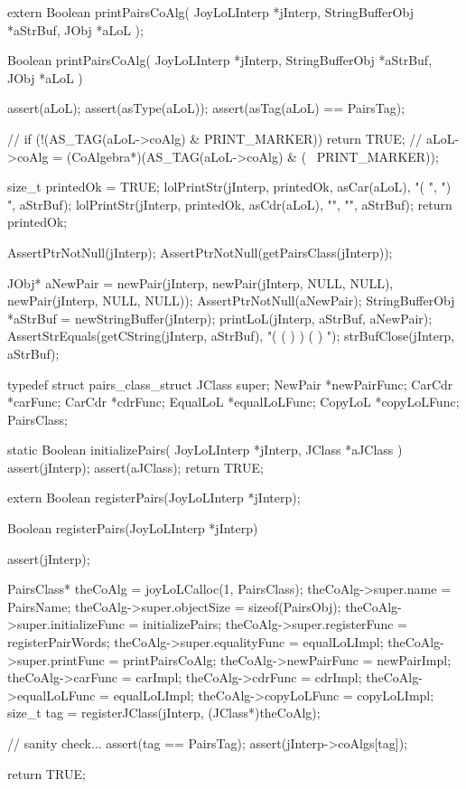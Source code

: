 \startCHeader
extern Boolean printPairsCoAlg(
  JoyLoLInterp    *jInterp,
  StringBufferObj *aStrBuf,
  JObj        *aLoL
);
\stopCHeader
{}

\startCCode
Boolean printPairsCoAlg(
  JoyLoLInterp    *jInterp,
  StringBufferObj *aStrBuf,
  JObj        *aLoL
) {
  assert(aLoL);
  assert(asType(aLoL));
  assert(asTag(aLoL) == PairsTag);

//  if (!(AS_TAG(aLoL->coAlg) & PRINT_MARKER)) return TRUE;
//  aLoL->coAlg = (CoAlgebra*)(AS_TAG(aLoL->coAlg) & (~ PRINT_MARKER));

  size_t printedOk = TRUE;
  lolPrintStr(jInterp, printedOk, asCar(aLoL), "( ", ") ", aStrBuf);
  lolPrintStr(jInterp, printedOk, asCdr(aLoL), "",   "",   aStrBuf);
  return printedOk;
}
\stopCCode


\startCTest
  AssertPtrNotNull(jInterp);
  AssertPtrNotNull(getPairsClass(jInterp));

  JObj* aNewPair = newPair(jInterp,
                               newPair(jInterp, NULL, NULL),
                               newPair(jInterp, NULL, NULL));
  AssertPtrNotNull(aNewPair);
  StringBufferObj *aStrBuf = newStringBuffer(jInterp);
  printLoL(jInterp, aStrBuf, aNewPair);
  AssertStrEquals(getCString(jInterp, aStrBuf), "( ( ) ) ( ) ");
  strBufClose(jInterp, aStrBuf);
\stopCTest
\stopTestCase
\stopTestSuite

\startTestSuite[registerPairs]

\startCHeader
typedef struct pairs_class_struct {
  JClass  super;
  NewPair    *newPairFunc;
  CarCdr     *carFunc;
  CarCdr     *cdrFunc;
  EqualLoL   *equalLoLFunc;
  CopyLoL    *copyLoLFunc;
} PairsClass;
\stopCHeader

\startCCode
static Boolean initializePairs(
  JoyLoLInterp *jInterp,
  JClass   *aJClass
) {
  assert(jInterp);
  assert(aJClass);
  return TRUE;
}
\stopCCode

\startCHeader
extern Boolean registerPairs(JoyLoLInterp *jInterp);
\stopCHeader
{}

\startCCode
Boolean registerPairs(JoyLoLInterp *jInterp) {
  assert(jInterp);
  
  PairsClass* theCoAlg           = joyLoLCalloc(1, PairsClass);
  theCoAlg->super.name           = PairsName;
  theCoAlg->super.objectSize     = sizeof(PairsObj);
  theCoAlg->super.initializeFunc = initializePairs;
  theCoAlg->super.registerFunc   = registerPairWords;
  theCoAlg->super.equalityFunc   = equalLoLImpl;
  theCoAlg->super.printFunc      = printPairsCoAlg;
  theCoAlg->newPairFunc          = newPairImpl;
  theCoAlg->carFunc              = carImpl;
  theCoAlg->cdrFunc              = cdrImpl;
  theCoAlg->equalLoLFunc         = equalLoLImpl;
  theCoAlg->copyLoLFunc          = copyLoLImpl;
  size_t tag =
    registerJClass(jInterp, (JClass*)theCoAlg);
  
  // sanity check...
  assert(tag == PairsTag);
  assert(jInterp->coAlgs[tag]);

  return TRUE;
}
\stopCCode

